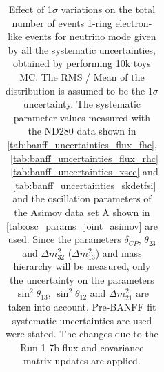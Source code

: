 \begin{table}[htb]
\begin{tabular}{| c | c | c |}
\end{tabular}
\caption{
 Effect of 1$\sigma$ variations on the total number of events 1-ring electron-like events for neutrino mode
 given by all the systematic uncertainties, obtained by performing 10k toys MC.
The RMS / Mean of the distribution is assumed to be the $1\sigma$ uncertainty.
The systematic parameter values measured with the ND280 data 
shown in 
\cref{tab:banff_uncertainties_flux_fhc},
~\ref{tab:banff_uncertainties_flux_rhc}
~\ref{tab:banff_uncertainties_xsec}
and
~\ref{tab:banff_uncertainties_skdetfsi}
and the oscillation parameters of the Asimov data set A shown in \cref{tab:osc_params_joint_asimov}
are used.
Since the parameters $\delta_{CP}$, $\theta_{23}$ and $\Delta m^2_{32}$ ($\Delta m^2_{13}$) and mass hierarchy
will be measured,
only the uncertainty on the parameters 
$\sin^2 \theta_{13}$,
$\sin^2 \theta_{12}$
and 
$\Delta m^2_{21}$ 
are taken into account.
Pre-BANFF fit systematic uncertainties are used were stated.
The changes due to the Run 1-7b flux and covariance matrix updates are applied.
}                                                                                                                                                                                          
\label{tab:nsk_systematic_table_summary_joint_asimov_A_fhc_elike_Run17b}
\end{table}





